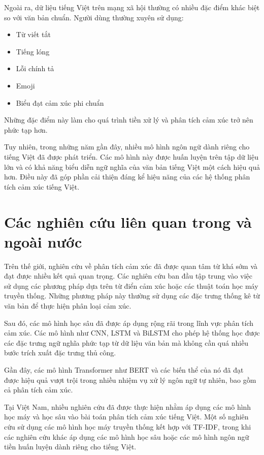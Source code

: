 \documentclass[14pt, a4paper]{report}
\begin{document}
Ngoài ra, dữ liệu tiếng Việt trên mạng xã hội thường có nhiều đặc điểm khác biệt so với văn bản chuẩn. Người dùng thường xuyên sử dụng:

\begin{itemize}
    \item Từ viết tắt
    \item Tiếng lóng
    \item Lỗi chính tả
    \item Emoji
    \item Biểu đạt cảm xúc phi chuẩn
\end{itemize}

Những đặc điểm này làm cho quá trình tiền xử lý và phân tích cảm xúc trở nên phức tạp hơn.

Tuy nhiên, trong những năm gần đây, nhiều mô hình ngôn ngữ dành riêng cho tiếng Việt đã được phát triển. Các mô hình này được huấn luyện trên tập dữ liệu lớn và có khả năng biểu diễn ngữ nghĩa của văn bản tiếng Việt một cách hiệu quả hơn. Điều này đã góp phần cải thiện đáng kể hiệu năng của các hệ thống phân tích cảm xúc tiếng Việt.

\section{Các nghiên cứu liên quan trong và ngoài nước}

Trên thế giới, nghiên cứu về phân tích cảm xúc đã được quan tâm từ khá sớm và đạt được nhiều kết quả quan trọng. Các nghiên cứu ban đầu tập trung vào việc sử dụng các phương pháp dựa trên từ điển cảm xúc hoặc các thuật toán học máy truyền thống. Những phương pháp này thường sử dụng các đặc trưng thống kê từ văn bản để thực hiện phân loại cảm xúc.

Sau đó, các mô hình học sâu đã được áp dụng rộng rãi trong lĩnh vực phân tích cảm xúc. Các mô hình như CNN, LSTM và BiLSTM cho phép hệ thống học được các đặc trưng ngữ nghĩa phức tạp từ dữ liệu văn bản mà không cần quá nhiều bước trích xuất đặc trưng thủ công.

Gần đây, các mô hình Transformer như BERT và các biến thể của nó đã đạt được hiệu quả vượt trội trong nhiều nhiệm vụ xử lý ngôn ngữ tự nhiên, bao gồm cả phân tích cảm xúc.

Tại Việt Nam, nhiều nghiên cứu đã được thực hiện nhằm áp dụng các mô hình học máy và học sâu vào bài toán phân tích cảm xúc tiếng Việt. Một số nghiên cứu sử dụng các mô hình học máy truyền thống kết hợp với TF-IDF, trong khi các nghiên cứu khác áp dụng các mô hình học sâu hoặc các mô hình ngôn ngữ tiền huấn luyện dành riêng cho tiếng Việt.
\end{document}
